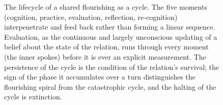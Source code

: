 \begin{figure}[t]
\begin{tikzpicture}
\end{tikzpicture}
\caption{\small The lifecycle of a shared flourishing as a cycle. The five moments
(cognition, practice, evaluation, reflection, re-cognition) interpenetrate and feed
back rather than forming a linear sequence. Evaluation, as the continuous and largely
unconscious updating of a belief about the state of the relation, runs through every
moment (the inner spokes) before it is ever an explicit measurement. The persistence
of the cycle is the condition of the relation's survival; the sign of the phase it
accumulates over a turn distinguishes the flourishing spiral from the catastrophic
cycle, and the halting of the cycle is extinction.}
\label{p11:fig:lifecycle}
\end{figure}
